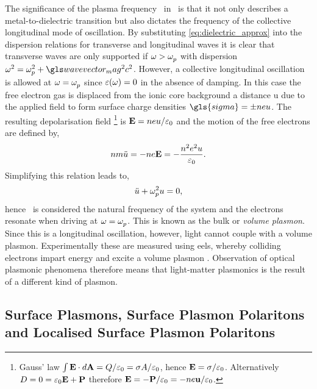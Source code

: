 \documentclass{article}
\begin{document}
The significance of the plasma frequency \omegap\ in \dielectric\ is that it not only describes a metal-to-dielectric transition but also dictates the frequency of the collective longitudinal mode of oscillation. By substituting \eqref{eq:dielectric_approx} into the dispersion relations for transverse and longitudinal waves it is clear that transverse waves are only supported if $\omega>\omegap$ with dispersion $\omega^2=\omegap[2]+\wvm^2c^2$. However, a collective longitudinal oscillation is allowed at $\omega=\omegap$ since $\dielectric=0$ in the absence of damping. In this case the free electron gas is displaced from the ionic core background a distance \gls{u} due to the applied field to form surface charge densities $\gls{sigma} = \pm neu$. The resulting depolarisation field%
\footnote{Gauss' law $\int \vec{E}\cdot d\vec{A} = Q/\epsfs=\sigma A/\epsfs$, hence $\vec{E}=\sigma/\epsfs$. Alternatively $D=0=\epsfs\vec{E}+\vec{P}$ therefore $\vec{E}=-\vec{P}/\epsfs=-ne\vec{u}/\epsfs$.}
is $\vec{E} = neu/\epsfs$ and the motion of the free electrons are defined by,
\begin{equation}
	nm\ddot{u} = -ne\vec{E} = -\frac{n^2e^2u}{\epsfs}.
\end{equation}
Simplifying this relation leads to,
\begin{equation}
	\ddot{u}+\omegap[2] u=0,
\end{equation}
hence \omegap\ is considered the natural frequency of the system and the electrons resonate when driving at $\omega=\omegap$. This is known as the bulk or \emph{volume plasmon}. Since this is a longitudinal oscillation, however, light cannot couple with a volume plasmon. Experimentally these are measured using \gls{eels}, whereby colliding electrons impart energy and excite a volume plasmon \cite{egerton2011electron}. Observation of optical plasmonic phenomena therefore means that light-matter plasmonics is the result of a different kind of plasmon. %

\subsection{Surface Plasmons, Surface Plasmon Polaritons and Localised Surface Plasmon Polaritons}
\end{document}
